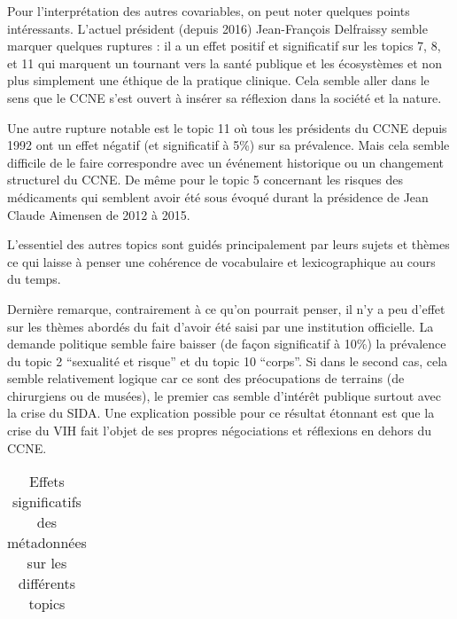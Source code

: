 \documentclass[
  letterpaper,
  DIV=11,
  numbers=noendperiod]{scrartcl}
\begin{document}
Pour l'interprétation des autres covariables, on peut noter quelques
points intéressants. L'actuel président (depuis 2016) Jean-François
Delfraissy semble marquer quelques ruptures : il a un effet positif et
significatif sur les topics 7, 8, et 11 qui marquent un tournant vers la
santé publique et les écosystèmes et non plus simplement une éthique de
la pratique clinique. Cela semble aller dans le sens que le CCNE s'est
ouvert à insérer sa réflexion dans la société et la nature.

Une autre rupture notable est le topic 11 où tous les présidents du CCNE
depuis 1992 ont un effet négatif (et significatif à 5\%) sur sa
prévalence. Mais cela semble difficile de le faire correspondre avec un
événement historique ou un changement structurel du CCNE. De même pour
le topic 5 concernant les risques des médicaments qui semblent avoir été
sous évoqué durant la présidence de Jean Claude Aimensen de 2012 à 2015.

L'essentiel des autres topics sont guidés principalement par leurs
sujets et thèmes ce qui laisse à penser une cohérence de vocabulaire et
lexicographique au cours du temps.

Dernière remarque, contrairement à ce qu'on pourrait penser, il n'y a
peu d'effet sur les thèmes abordés du fait d'avoir été saisi par une
institution officielle. La demande politique semble faire baisser (de
façon significatif à 10\%) la prévalence du topic 2 ``sexualité et
risque'' et du topic 10 ``corps''. Si dans le second cas, cela semble
relativement logique car ce sont des préocupations de terrains (de
chirurgiens ou de musées), le premier cas semble d'intérêt publique
surtout avec la crise du SIDA. Une explication possible pour ce résultat
étonnant est que la crise du VIH fait l'objet de ses propres
négociations et réflexions en dehors du CCNE.

\hypertarget{tbl-stm-main_effects}{}
\begin{table}
\caption{\label{tbl-stm-main_effects}Effets significatifs des métadonnées sur les différents topics }\tabularnewline

\centering
\begin{tabular}{}
\hline

\hline
\end{tabular}
\end{table}
\end{document}
